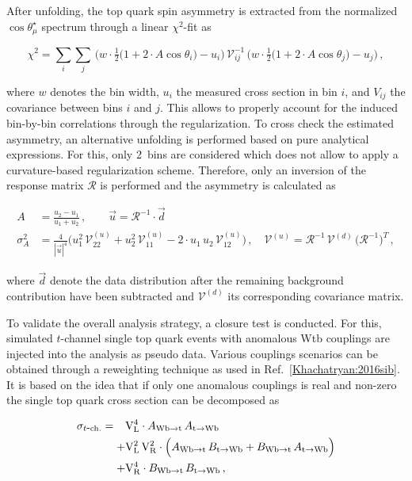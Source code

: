 After unfolding, the top quark spin asymmetry is extracted from the normalized $\cos\theta_\mu^\star$ spectrum through a linear $\chi^2$-fit as

\begin{equation}
\chi^{2}=\sum_{i}\sum_{j}\,\Big(w\cdot\tfrac{1}{2}\big(1+2\cdot A \cos\theta_{i}\big)-u_{i}\Big)\,\mathcal{V}_{ij}^{-1}\,\Big(w\cdot\tfrac{1}{2}\big(1+2\cdot A \cos\theta_{j}\big)-u_{j}\Big)\,,
\end{equation}

where $w$ denotes the bin width, $u_{i}$ the measured cross section in bin $i$, and $V_{ij}$ the covariance between bins $i$ and $j$. This allows to properly account for the induced bin-by-bin correlations through the regularization. To cross check the estimated asymmetry, an alternative unfolding is performed based on pure analytical expressions. For this, only 2~bins are considered which does not allow to apply a curvature-based regularization scheme. Therefore, only an inversion of the response matrix $\mathcal{R}$ is performed and the asymmetry is calculated as

\begin{align}
A&=\frac{u_2-u_1}{u_1+u_2}\,,\qquad \vec{u}=\mathcal{R}^{-1}\cdot\vec{d}\\
\sigma^2_{A}&=\frac{4}{|\vec{u}|^4}\Big(u_1^2\,\mathcal{V}^{(u)}_{22}+u_2^2\,\mathcal{V}^{(u)}_{11}-2\cdot u_1\,u_{2}\,\mathcal{V}^{(u)}_{12}\Big)\,,\quad\mathcal{V}^{(u)}=\mathcal{R}^{-1}\,\mathcal{V}^{(d)}\,\big(\mathcal{R}^{-1}\big)^{T}\,,
\end{align}

where $\vec{d}$ denote the data distribution after the remaining background contribution have been subtracted and $\mathcal{V}^{(d)}$ its corresponding covariance matrix.

To validate the overall analysis strategy, a closure test is conducted. For this, simulated $t$-channel single top quark events with anomalous Wtb couplings are injected into the analysis as pseudo data. Various couplings scenarios can be obtained through a reweighting technique as used in Ref.~\ref{Khachatryan:2016sib}. It is based on the idea that if only one anomalous couplings is real and non-zero the single top quark cross section can be decomposed as

\begin{subequations}
\begin{align}
\sigma_{t\mathrm{\mbox{-}ch.}}=\hphantom{+}&\mathrm{V}_\mathrm{L}^4\cdot A_{\mathrm{Wb}\to\mathrm{t}}\,A_{\mathrm{t}\to\mathrm{Wb}}\label{eq:polarization-wtb-rew-vl}\\+&\mathrm{V}_\mathrm{L}^2\,\mathrm{V}_\mathrm{R}^2\cdot \Big(A_{\mathrm{Wb}\to\mathrm{t}}\,B_{\mathrm{t}\to\mathrm{Wb}}+B_{\mathrm{Wb}\to\mathrm{t}}\,A_{\mathrm{t}\to\mathrm{Wb}}\Big)\label{eq:polarization-wtb-rew-vlvr}\\+&\mathrm{V}_\mathrm{R}^4\cdot B_{\mathrm{Wb}\to\mathrm{t}}\,B_{\mathrm{t}\to\mathrm{Wb}}\label{eq:polarization-wtb-rew-vr}\,,
\end{align}
\end{subequations}

